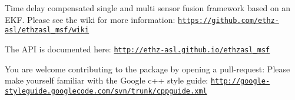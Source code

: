 Time delay compensated single and multi sensor fusion framework based on an E\-K\-F. Please see the wiki for more information\-: \href{https://github.com/ethz-asl/ethzasl_msf/wiki}{\tt https\-://github.\-com/ethz-\/asl/ethzasl\-\_\-msf/wiki}

The A\-P\-I is documented here\-: \href{http://ethz-asl.github.io/ethzasl_msf}{\tt http\-://ethz-\/asl.\-github.\-io/ethzasl\-\_\-msf}

You are welcome contributing to the package by opening a pull-\/request\-: Please make yourself familiar with the Google c++ style guide\-: \href{http://google-styleguide.googlecode.com/svn/trunk/cppguide.xml}{\tt http\-://google-\/styleguide.\-googlecode.\-com/svn/trunk/cppguide.\-xml} 